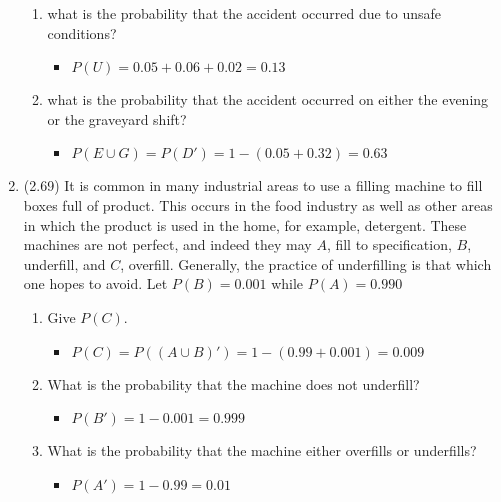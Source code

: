 \documentclass[basic, header]{nosvagor-notes} \usepackage{nosvagor-math}
\begin{document}
\begin{enumerate}[itemsep=8em]
\begin{enumerate}
     \item what is the probability that the accident occurred
     due to unsafe conditions?
     \begin{itemize}
       \item \(P(U) = 0.05 + 0.06 + 0.02 = 0.13\)

     \end{itemize}

     \item what is the probability that the accident
     occurred on either the evening or the graveyard shift?
     \begin{itemize}
       \item \(P(E \cup G) = P(D') = 1 - (0.05 + 0.32) = 0.63\)

     \end{itemize}

    \end{enumerate}

  \newpage %

  \item (2.69) It is common in many industrial areas to use a filling
    machine to fill boxes full of product. This occurs in the food industry as
    well as other areas in which the product is used in the home, for example,
    detergent. These machines are not perfect, and indeed they may \(A\), fill to
    specification, \(B\), underfill, and \(C\), overfill. Generally, the practice of
    underfilling is that which one hopes to avoid. Let \(P(B) = 0.001\) while
    \(P(A) = 0.990\)
    \begin{enumerate}

      \item Give \(P(C)\).
        \begin{itemize}
          \item \(P(C) = P((A \cup B)') = 1 - (0.99 + 0.001) = 0.009\)

        \end{itemize}

      \item What is the probability that the machine does not underfill?
        \begin{itemize}
          \item \(P(B') = 1 - 0.001 = 0.999\)

        \end{itemize}

      \item  What is the probability that the machine either overfills or
        underfills?
        \begin{itemize}
          \item \(P(A') = 1 - 0.99 = 0.01 \)


\end{itemize}
\end{enumerate}
\end{enumerate}
\end{document}
